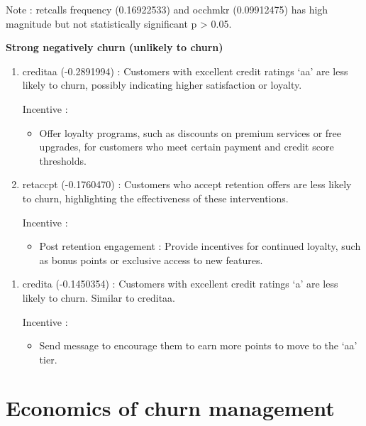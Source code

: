 \documentclass[
]{article}
\providecommand{\tightlist}{%
  \setlength{\itemsep}{0pt}\setlength{\parskip}{0pt}}
\begin{document}
Note : retcalls frequency (0.16922533) and occhmkr (0.09912475) has high
magnitude but not statistically significant p \textgreater{} 0.05.

\textbf{Strong negatively churn (unlikely to churn)}

\begin{enumerate}
\def\labelenumi{\arabic{enumi}.}
\item
  creditaa (-0.2891994) : Customers with excellent credit ratings `aa'
  are less likely to churn, possibly indicating higher satisfaction or
  loyalty.

  Incentive :

  \begin{itemize}
  \tightlist
  \item
    Offer loyalty programs, such as discounts on premium services or
    free upgrades, for customers who meet certain payment and credit
    score thresholds.
  \end{itemize}
\item
  retaccpt (-0.1760470) : Customers who accept retention offers are less
  likely to churn, highlighting the effectiveness of these
  interventions.

  Incentive :

  \begin{itemize}
  \tightlist
  \item
    Post retention engagement : Provide incentives for continued
    loyalty, such as bonus points or exclusive access to new features.
  \end{itemize}
\end{enumerate}

\begin{enumerate}
\def\labelenumi{\arabic{enumi}.}
\setcounter{enumi}{2}
\item
  credita (-0.1450354) : Customers with excellent credit ratings `a' are
  less likely to churn. Similar to creditaa.

  Incentive :

  \begin{itemize}
  \tightlist
  \item
    Send message to encourage them to earn more points to move to the
    `aa' tier.
  \end{itemize}
\end{enumerate}

\newpage

\section{Economics of churn
management}\label{economics-of-churn-management}
\end{document}
